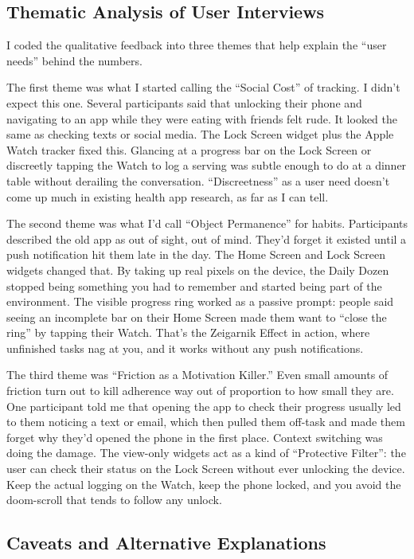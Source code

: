 \documentclass[10pt,twocolumn]{article}
\begin{document}
\subsection{Thematic Analysis of User Interviews}

I coded the qualitative feedback into three themes that help explain the ``user needs'' behind the numbers.

The first theme was what I started calling the ``Social Cost'' of tracking. I didn't expect this one. Several participants said that unlocking their phone and navigating to an app while they were eating with friends felt rude. It looked the same as checking texts or social media. The Lock Screen widget plus the Apple Watch tracker fixed this. Glancing at a progress bar on the Lock Screen or discreetly tapping the Watch to log a serving was subtle enough to do at a dinner table without derailing the conversation. ``Discreetness'' as a user need doesn't come up much in existing health app research, as far as I can tell.

The second theme was what I'd call ``Object Permanence'' for habits. Participants described the old app as out of sight, out of mind. They'd forget it existed until a push notification hit them late in the day. The Home Screen and Lock Screen widgets changed that. By taking up real pixels on the device, the Daily Dozen stopped being something you had to remember and started being part of the environment. The visible progress ring worked as a passive prompt: people said seeing an incomplete bar on their Home Screen made them want to ``close the ring'' by tapping their Watch. That's the Zeigarnik Effect in action, where unfinished tasks nag at you,\cite{ZeigarnikEffect} and it works without any push notifications.

The third theme was ``Friction as a Motivation Killer.''\cite{LiPersonalInformatics} Even small amounts of friction turn out to kill adherence way out of proportion to how small they are. One participant told me that opening the app to check their progress usually led to them noticing a text or email, which then pulled them off-task and made them forget why they'd opened the phone in the first place. Context switching was doing the damage. The view-only widgets act as a kind of ``Protective Filter'': the user can check their status on the Lock Screen without ever unlocking the device. Keep the actual logging on the Watch, keep the phone locked, and you avoid the doom-scroll that tends to follow any unlock.

\subsection{Caveats and Alternative Explanations}
\end{document}
